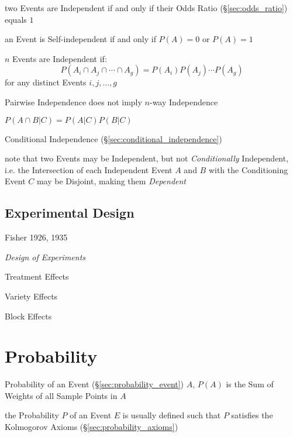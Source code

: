 \fist two Events are Independent if and only if their Odds Ratio
(\S\ref{sec:odds_ratio}) equals $1$

an Event is Self-independent if and only if $P(A) = 0$ or $P(A) = 1$

$n$ Events are Independent if:
\[
  P(A_i \cap A_j \cap \cdots \cap A_g) = P(A_i)P(A_j) \cdots P(A_g)
\]
for any distinct Events $i,j,\ldots,g$

Pairwise Independence does not imply $n$-way Independence

$P(A \cap B | C) = P(A|C)P(B|C)$

\fist Conditional Independence (\S\ref{sec:conditional_independence})

note that two Events may be Independent, but not \emph{Conditionally}
Independent, i.e. the Intersection of each Independent Event $A$ and $B$ with
the Conditioning Event $C$ may be Disjoint, making them \emph{Dependent}



\subsection{Experimental Design}\label{sec:experimental_design}


Fisher 1926, 1935

\emph{Design of Experiments}

Treatment Effects

Variety Effects

Block Effects



\section{Probability}\label{sec:probability}

Probability of an Event (\S\ref{sec:probability_event}) $A$, $P(A)$ is the Sum
of Weights of all Sample Points in $A$

the Probability $P$ of an Event $E$ is usually defined such that $P$ satisfies
the Kolmogorov Axioms (\S\ref{sec:probability_axioms})

